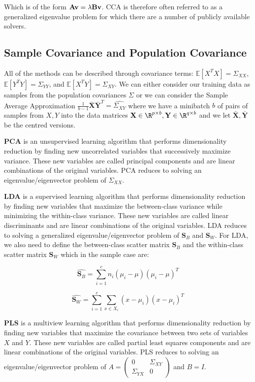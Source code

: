 Which is of the form $\bold{A v} = \lambda \bold{B v}$. CCA is therefore often referred to as a generalized eigenvalue problem for which there are a number of publicly available solvers.

\subsection{Sample Covariance and Population Covariance}
All of the methods can be described through covariance terms: $\mathbb{E}[X^TX]=\Sigma_{XX}$, $\mathbb{E}[Y^TY]=\Sigma_{YY}$, and $\mathbb{E}[X^TY]=\Sigma_{XY}$. We can either consider our training data as samples from the population covariances $\Sigma$ or we can consider the Sample Average Approximation $\frac{1}{b-1}\bar{\mathbf{X}} \bar{\mathbf{Y}}^T=\hat{\Sigma_{XY}}$ where we have a minibatch $b$ of pairs of samples from $X,Y$ into the data matrices $\mathbf{X} \in \R^{p \times b}, \mathbf{Y} \in \R^{q \times b}$ and we let $\bar{\mathbf{X}},\bar{\mathbf{Y}}$ be the centred versions.

\textbf{PCA} is an unsupervised learning algorithm that performs dimensionality reduction by finding new uncorrelated variables that successively maximize variance. These new variables are called principal components and are linear combinations of the original variables. PCA reduces to solving an eigenvalue/eigenvector problem of $\Sigma_{XX}$.

\textbf{LDA} is a supervised learning algorithm that performs dimensionality reduction by finding new variables that maximize the between-class variance while minimizing the within-class variance. These new variables are called linear discriminants and are linear combinations of the original variables. LDA reduces to solving a generalized eigenvalue/eigenvector problem of $\mathbf{S}_B$ and $\mathbf{S}_W$. For LDA, we also need to define the between-class scatter matrix $\mathbf{S}_B$ and the within-class scatter matrix $\mathbf{S}_W$ which in the sample case are:

$$
\hat{\mathbf{S}_B} = \sum_{i=1}^{c} n_i (\mu_i - \mu)(\mu_i - \mu)^T
$$

$$
\hat{\mathbf{S}_W} = \sum_{i=1}^{c} \sum_{x \in X_i} (x - \mu_i)(x - \mu_i)^T
$$

\textbf{PLS} is a multiview learning algorithm that performs dimensionality reduction by finding new variables that maximize the covariance between two sets of variables $X$ and $Y$. These new variables are called partial least squares components and are linear combinations of the original variables. PLS reduces to solving an eigenvalue/eigenvector problem of $A=\begin{pmatrix} 0 & \Sigma_{XY} \\ \Sigma_{YX} & 0 \end{pmatrix}$ and $B=I$. 

